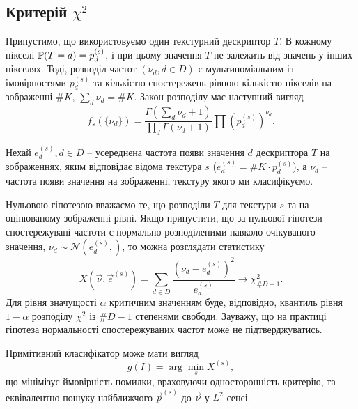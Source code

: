 \subsection{Критерій $\chi^2$}\label{section1.3a}

Припустимо, що використовуємо один текстурний дескриптор $T$.
В кожному пікселі $\P(T = d) = p^{(s)}_d$, і при цьому значення $T$ не залежить від значень у інших пікселях.
Тоді, розподіл частот $\left(\nu_d, d\in D\right)$ є мультиноміальним із імовірностями $p^{(s)}_d$ та 
кількістю спостережень рівною кількістю пікселів на зображенні $\# K$, $\sum_{d}\nu_d = \# K$. 
Закон розподілу має наступний вигляд
\begin{equation*}
    f_s(\{ \nu_d \}) = \frac {\Gamma (\sum_{d}\nu_{d}+1)}{\prod_{d}\Gamma (\nu_{d}+1)} \prod (p^{(s)}_d)^{\nu_d}.
\end{equation*}

Нехай $e^{(s)}_d, d \in D$ -- усереднена частота появи значення $d$ дескриптора $T$ на зображеннях, яким відповідає відома текстура $s$
($e^{(s)}_d = \# K \cdot p^{(s)}_d$), а $\nu_d$ -- частота появи значення на зображенні, текстуру якого ми класифікуємо.

Нульовою гіпотезою вважаємо те, що розподіли $T$ для текстури $s$ та на оцінюваному зображенні рівні.
Якщо припустити, що за нульової гіпотези спостережувані частоти є нормально розподіленими навколо очікуваного значення, $\nu_d \sim \mathcal N(e^{(s)}_d, )$, то можна розглядати статистику
\begin{equation*}\label{e:chi2crit}
    X(\vec \nu,\vec e^{(s)}) = \sum_{d \in D} \frac{\left(\nu_d - e^{(s)}_d\right)^2}{e^{(s)}_d} \longrightarrow \chi^2_{\# D - 1}.
\end{equation*}
Для рівня значущості $\alpha$ критичним значенням буде, відповідно, квантиль рівня $1-\alpha$ розподілу $\chi^2$ із $\# D - 1$ степенями свободи.
Зауважу, що на практиці гіпотеза нормальності спостережуваних частот може не підтверджуватись.

Примітивний класифікатор може мати вигляд
\begin{equation*}\label{e:chi2classifier}
    g(I) = \arg \min_{s} X^{(s)},
\end{equation*} 
що мінімізує ймовірність помилки, враховуючи односторонність критерію, та еквівалентно пошуку найближчого $\vec p^{(s)}$ до $\vec \nu$ у $L^2$ сенсі.

